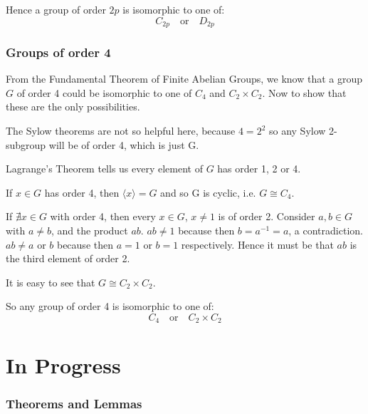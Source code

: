 \documentclass[a4paper, oneside, 12pt, final]{article}
\theoremstyle{definition}
\begin{document}
Hence a group of order \(2p\) is isomorphic to one of:
\[C_{2p} \quad \text{or} \quad D_{2p}\]

\section{Groups of order 4}
From the Fundamental Theorem of Finite Abelian Groups, we know that a group
\(G\) of order 4 could be isomorphic to one of \(C_4\) and \(C_2 \times C_2\).
Now to show that these are the only possibilities.

The Sylow theorems are not so helpful here, because \(4=2^2\) so any Sylow
2-subgroup will be of order 4, which is just G.

Lagrange's Theorem tells us every element of \(G\) has order 1, 2 or 4.

If \(x \in G\) has order 4, then \(\langle x \rangle = G\) and so G is cyclic,
i.e. \(G \cong C_4\).

If \(\nexists x \in G\) with order 4, then every \(x \in G\), \(x \neq 1\) is
of order 2.
Consider \(a, b \in G\) with \(a \neq b\), and the product \(ab\).
\(ab \neq 1\) because then \(b = a^{-1} = a\), a contradiction.
\(ab \neq a\) or \(b\) because then \(a = 1\) or \(b = 1\) respectively.
Hence it must be that \(ab\) is the third element of order 2.

It is easy to see that \(G \cong C_2 \times C_2\).

So any group of order 4 is isomorphic to one of:
\[C_4 \quad \text{or} \quad C_2 \times C_2\]

\part{In Progress}

\section{Theorems and Lemmas}
\end{document}
